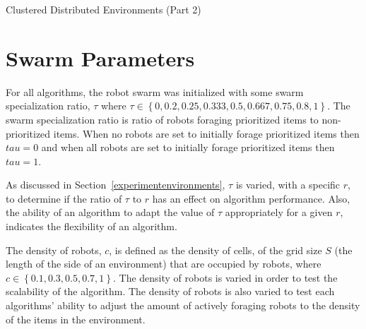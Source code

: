 \begin{algorithm}

\caption{Clustered Distributed Environments (Part 2)}
\label{algorithm:clustered}
\begin{algorithmic}[1]
	  \State {}
	  \State {}
	  \State {}
	
		  \State {}
		  \State {}
		  \State {}
				
        	\State {}
        	\State {}
				  \State {}
				  \State {}	
			  \EndIf
		  \EndWhile
		\EndIf
	\EndWhile
\EndFunction
\end{algorithmic}
\end{algorithm}


\section{Swarm Parameters}
\label{parameters}

For all algorithms, the robot swarm was initialized with 
some swarm specialization ratio, $\tau$ where $\tau\in\left\{0, 0.2, 0.25, 0.333, 0.5, 0.667, 0.75, 0.8,1\right\}$. The swarm specialization ratio is ratio of robots foraging prioritized items to non-prioritized items. When no robots are set to initially forage prioritized items then $tau=0$ and when all robots are set to initially forage prioritized items then $tau=1$.

As discussed in Section~\ref{experimentenvironments}, $\tau$ is varied, with a specific $r$, to determine if the ratio of $\tau$ to $r$ has an effect on algorithm performance. Also, the ability of an algorithm to adapt the value of $\tau$ appropriately for a given $r$, indicates the flexibility of an algorithm. %

The density of robots, $c$, is defined as the density of cells, of the grid size $S$ (the length of the side of an environment) that are occupied by robots, where $c\in\left\{0.1, 0.3, 0.5, 0.7, 1\right\}$. The density of robots is varied in order to test the scalability of the algorithm. The density of robots is also varied to test each algorithms' ability to adjust the amount of actively  foraging robots to the density of the items in the environment.

